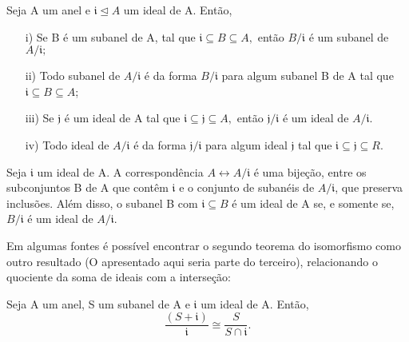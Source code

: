 \documentclass[AlgebraII/algebraII_notes.tex]{subfiles}
\begin{document}
\begin{theorem*}
	Seja A um anel e \(\mathfrak{i} \trianglelefteq{A}\) um ideal de A. Então,
	\begin{itemize}
		\item[i)] Se B é um subanel de A, tal que \(\mathfrak{i}\subseteq B\subseteq A,\) então \(B/\mathfrak{i}\) é um
		      subanel de \(A/\mathfrak{i};\)
		\item[ii)] Todo subanel de \(A/\mathfrak{i}\) é da forma \(B/\mathfrak{i}\) para algum subanel B de A tal que
		      \(\mathfrak{i} \subseteq B \subseteq A\);
		\item[iii)] Se \(\mathfrak{j}\) é um ideal de A tal que \(\mathfrak{i}\subseteq \mathfrak{j}\subseteq A,\) então
		      \(\mathfrak{j}/\mathfrak{i}\) é um ideal de \(A/\mathfrak{i}.\)
		\item[iv)] Todo ideal de \(A/\mathfrak{i}\) é da forma \(\mathfrak{j}/\mathfrak{i}\) para algum ideal \(\mathfrak{j}\) tal que
		      \(\mathfrak{i}\subseteq \mathfrak{j}\subseteq R.\)
	\end{itemize}
\end{theorem*}
\begin{theorem*}
	Seja \(\mathfrak{i}\) um ideal de A. A correspondência \(A\longleftrightarrow A/\mathfrak{i}\) é uma bijeção, entre os subconjuntos B de A que contêm \(\mathfrak{i}\) e o
	conjunto de subanéis de \(A/\mathfrak{i}\), que preserva inclusões. Além disso, o subanel B com \(\mathfrak{i} \subseteq B\) é um ideal de A se, e somente se,
	\(B/\mathfrak{i}\) é um ideal de \(A/\mathfrak{i}\).
\end{theorem*}
Em algumas fontes é possível encontrar o segundo teorema do isomorfismo como outro resultado (O apresentado aqui seria parte do terceiro), relacionando o quociente da soma de ideais
com a interseção:
\begin{theorem*}
	Seja A um anel, S um subanel de A e \(\mathfrak{i}\) um ideal de A. Então,
	\[
		\frac{(S+\mathfrak{i})}{\mathfrak{i}}\cong{\frac{S}{S\cap \mathfrak{i}}}.
	\]
\end{theorem*}
\end{document}
